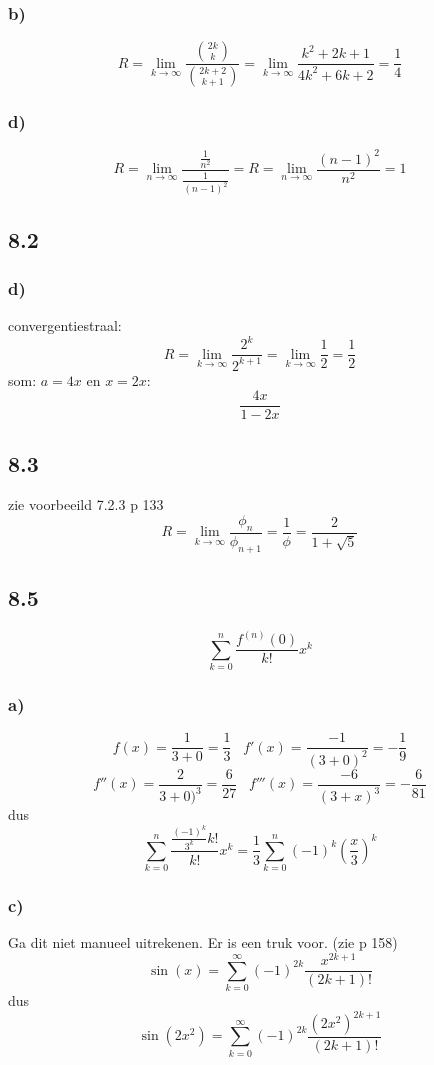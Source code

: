 \documentclass[11pt]{article}
\begin{document}
\subsubsection*{b)}
\[
R=\lim_{k\rightarrow\infty}\frac{\binom{2k}{k}}{\binom{2k+2}{k+1}}
=
\lim_{k\rightarrow\infty}\frac{k^2+2k+1}{4k^2+6k+2}
=
\frac{1}{4} 
\]

\subsubsection*{d)}
\[
R=\lim_{n\rightarrow\infty}\frac{\frac{1}{n^2}}{\frac{1}{(n-1)^2}}
=
R=\lim_{n\rightarrow\infty}\frac{(n-1)^2}{n^2}
=
1
\]

\subsection*{8.2}
\subsubsection*{d)}
convergentiestraal:
\[
R=\lim_{k\rightarrow\infty}\frac{2^k}{2^{k+1}}
=
\lim_{k\rightarrow\infty}\frac{1}{2}
=
\frac{1}{2}
\]
som: $a=4x$ en $x=2x$:
\[
\frac{4x}{1-2x}
\]

\subsection*{8.3}
zie voorbeeild 7.2.3 p 133
\[
R=\lim_{k\rightarrow\infty}\frac{\phi_n}{\phi_{n+1}} = \frac{1}{\phi} = \frac{2}{1+\sqrt{5}}
\]

\subsection*{8.5}
\[
\sum_{k=0}^n\frac{f^{(n)}(0)}{k!}x^k
\]
\[
\]

\subsubsection*{a)}
\[
f(x) = \frac{1}{3+0}= \frac{1}{3} \;\;\; f'(x) = \frac{-1}{(3+0)^2}=-\frac{1}{9}
\]
\[
f''(x) = \frac{2}{3+0)^3}=\frac{6}{27} \;\;\; f'''(x) =\frac{-6}{(3+x)^3} = -\frac{6}{81}
\]
dus
\[
\sum_{k=0}^n\frac{\frac{(-1)^k}{3^k}k!}{k!}x^k
=\frac{1}{3}\sum_{k=0}^n(-1)^k\left(\frac{x}{3}\right)^k 
\]

\subsubsection*{c)}
Ga dit niet manueel uitrekenen. Er is een truk voor.
(zie p 158)
\[
\sin(x) = \sum_{k=0}^\infty(-1)^{2k}\frac{x^{2k+1}}{(2k+1)!}
\]
dus
\[
\sin(2x^2) = \sum_{k=0}^\infty(-1)^{2k}\frac{(2x^2)^{2k+1}}{(2k+1)!}
\]
\end{document}
